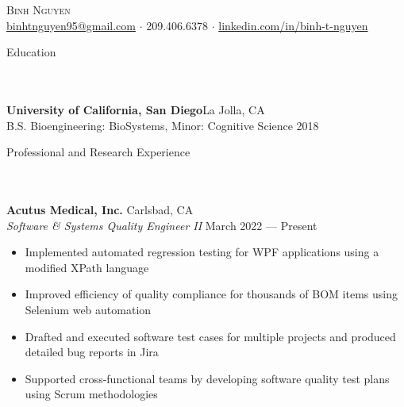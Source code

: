 \documentclass{article}
\newcommand{\lineunder} {
    \vspace*{-8pt} \\
    \hspace*{-18pt} \hrulefill \\
}
\newcommand{\header} [1] {
    {\hspace*{-18pt}\vspace*{6pt} \Large{#1} }
    \vspace*{-6pt} 
    \lineunder
}
\begin{document}

\vspace*{-50pt}


\begin{center}
	{\Huge \scshape {Binh Nguyen}}\\
	\vspace{2mm}
	\href{mailto:binhtnguyen95@gmail.com}{binhtnguyen95@gmail.com} $\cdot$ 
	209.406.6378 $\cdot$ 
	\href{https://www.linkedin.com/in/binh-t-nguyen}{linkedin.com/in/binh-t-nguyen} 
\end{center}

\header{Education}
\textbf{University of California, San Diego}\hfill La Jolla, CA\\
B.S. Bioengineering: BioSystems, Minor: Cognitive Science \hfill 2018\\
\vspace{7mm}

\header{Professional and Research Experience}

\textbf{Acutus Medical, Inc.} \hfill Carlsbad, CA\\
\textit{Software \& Systems Quality Engineer II} \hfill March 2022 --- Present\\
\vspace{-2mm}
\begin{itemize} \itemsep 0.05pt
	\item Implemented automated regression testing for WPF applications using a modified XPath language
	\item Improved efficiency of quality compliance for thousands of BOM items using Selenium web automation
	\item Drafted and executed software test cases for multiple projects and produced detailed bug reports in Jira
	\item Supported cross-functional teams by developing software quality test plans using Scrum methodologies
\end{itemize}
\end{document}
